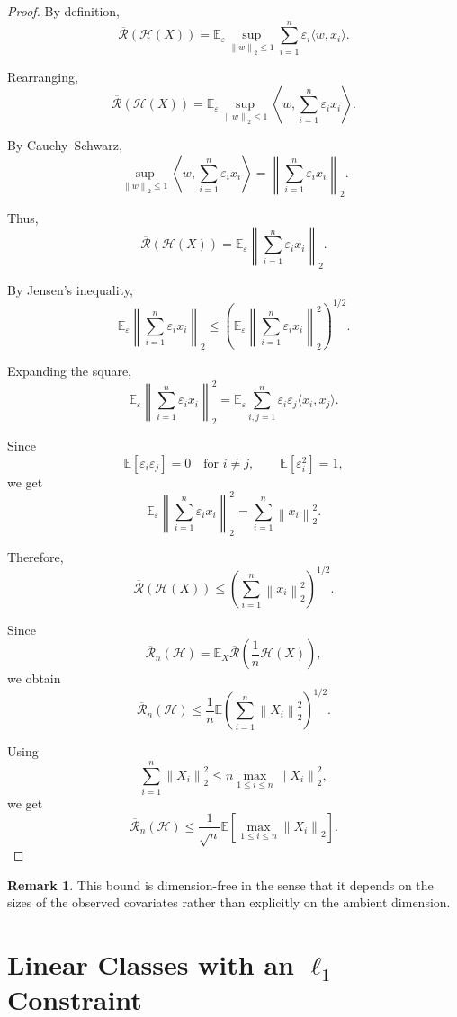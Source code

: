 \documentclass[12pt,oneside]{book}
\numberwithin{equation}{section}
\theoremstyle{definition}
\newtheorem{remark}{Remark}[section]
\theoremstyle{plain}
\theoremstyle{remark}
\newcommand{\E}{\mathbb{E}}
\newcommand{\norm}[1]{\left\lVert #1 \right\rVert}
\begin{document}
\begin{proof}
By definition,
\[
\overline{\mathcal{R}}(\mathcal{H}(X))
=
\E_\varepsilon
\sup_{\norm{w}_2\leq 1}
\sum_{i=1}^n
\varepsilon_i \langle w,x_i\rangle.
\]

Rearranging,
\[
\overline{\mathcal{R}}(\mathcal{H}(X))
=
\E_\varepsilon
\sup_{\norm{w}_2\leq1}
\left\langle
w,
\sum_{i=1}^n \varepsilon_i x_i
\right\rangle.
\]

By Cauchy--Schwarz,
\[
\sup_{\norm{w}_2\leq1}
\left\langle
w,
\sum_{i=1}^n \varepsilon_i x_i
\right\rangle
=
\left\|
\sum_{i=1}^n \varepsilon_i x_i
\right\|_2.
\]

Thus,
\[
\overline{\mathcal{R}}(\mathcal{H}(X))
=
\E_\varepsilon
\left\|
\sum_{i=1}^n \varepsilon_i x_i
\right\|_2.
\]

By Jensen's inequality,
\[
\E_\varepsilon
\left\|
\sum_{i=1}^n \varepsilon_i x_i
\right\|_2
\leq
\left(
\E_\varepsilon
\left\|
\sum_{i=1}^n \varepsilon_i x_i
\right\|_2^2
\right)^{1/2}.
\]

Expanding the square,
\[
\E_\varepsilon
\left\|
\sum_{i=1}^n \varepsilon_i x_i
\right\|_2^2
=
\E_\varepsilon
\sum_{i,j=1}^n
\varepsilon_i\varepsilon_j
\langle x_i,x_j\rangle.
\]

Since
\[
\E[\varepsilon_i\varepsilon_j]=0
\quad\text{for } i\neq j,
\qquad
\E[\varepsilon_i^2]=1,
\]
we get
\[
\E_\varepsilon
\left\|
\sum_{i=1}^n \varepsilon_i x_i
\right\|_2^2
=
\sum_{i=1}^n \norm{x_i}_2^2.
\]

Therefore,
\[
\overline{\mathcal{R}}(\mathcal{H}(X))
\leq
\left(
\sum_{i=1}^n \norm{x_i}_2^2
\right)^{1/2}.
\]

Since
\[
\overline{\mathcal{R}}_n(\mathcal{H})
=
\E_X
\overline{\mathcal{R}}
\left(
\frac{1}{n}\mathcal{H}(X)
\right),
\]
we obtain
\[
\overline{\mathcal{R}}_n(\mathcal{H})
\leq
\frac{1}{n}
\E
\left(
\sum_{i=1}^n \norm{X_i}_2^2
\right)^{1/2}.
\]

Using
\[
\sum_{i=1}^n \norm{X_i}_2^2
\leq
n\max_{1\leq i\leq n}\norm{X_i}_2^2,
\]
we get
\[
\overline{\mathcal{R}}_n(\mathcal{H})
\leq
\frac{1}{\sqrt{n}}
\E\left[
\max_{1\leq i\leq n}\norm{X_i}_2
\right].
\]
\end{proof}

\begin{remark}
This bound is dimension-free in the sense that it depends on the sizes of the observed covariates rather than explicitly on the ambient dimension.
\end{remark}

\section{Linear Classes with an \texorpdfstring{$\ell_1$}{l1} Constraint}
\end{document}
